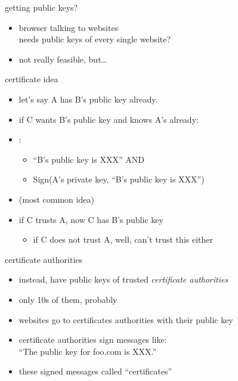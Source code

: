 \begin{frame}{getting public keys?}
    \begin{itemize}
    \item browser talking to websites \\
    needs public keys of every single website?
    \vspace{.5cm}
    \item not really feasible, but\ldots
    \end{itemize}
\end{frame}

\begin{frame}{certificate idea}
    \begin{itemize}
        \item let's say A has B's public key already.
        \item if C wants B's public key and knows A's already:
            \vspace{.5cm}
        \item {}:
            \begin{itemize}
            \item ``B's public key is XXX'' AND
            \item Sign(A's private key, ``B's public key is XXX'')
            \end{itemize}
        \item {} (most common idea)
        \item if C trusts A, now C has B's public key
            \begin{itemize}
            \item if C does not trust A, well, can't trust this either
            \end{itemize}
    \end{itemize}
\end{frame}

\begin{frame}{certificate authorities}
    \begin{itemize}
    \item instead, have public keys of trusted \textit{certificate authorities}
    \item only 10s of them, probably
    \vspace{.5cm}
    \item websites go to certificates authorities with their public key
    \item certificate authorities sign messages like: \\
        ``The public key for foo.com is XXX.''
    \item these signed messages called ``certificates''
    \end{itemize}
\end{frame}


